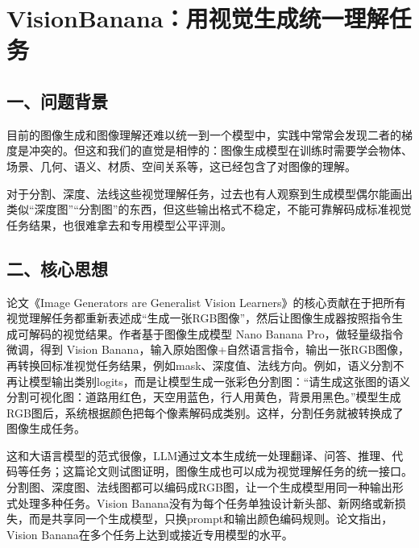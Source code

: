 \clearpage

\hypertarget{visionbananaux7528ux89c6ux89c9ux751fux6210ux7edfux4e00ux7406ux89e3ux4efbux52a1}{%
\section{VisionBanana：用视觉生成统一理解任务}\label{visionbananaux7528ux89c6ux89c9ux751fux6210ux7edfux4e00ux7406ux89e3ux4efbux52a1}}

\hypertarget{ux4e00ux95eeux9898ux80ccux666f-6}{%
\subsection{一、问题背景}\label{ux4e00ux95eeux9898ux80ccux666f-6}}

目前的图像生成和图像理解还难以统一到一个模型中，实践中常常会发现二者的梯度是冲突的。但这和我们的直觉是相悖的：图像生成模型在训练时需要学会物体、场景、几何、语义、材质、空间关系等，这已经包含了对图像的理解。

对于分割、深度、法线这些视觉理解任务，过去也有人观察到生成模型偶尔能画出类似``深度图''``分割图''的东西，但这些输出格式不稳定，不能可靠解码成标准视觉任务结果，也很难拿去和专用模型公平评测。

\hypertarget{ux4e8cux6838ux5fc3ux601dux60f3-5}{%
\subsection{二、核心思想}\label{ux4e8cux6838ux5fc3ux601dux60f3-5}}

论文《Image Generators are Generalist Vision Learners》的核心贡献在于把所有视觉理解任务都重新表述成``生成一张RGB图像''，然后让图像生成器按照指令生成可解码的视觉结果。作者基于图像生成模型 Nano Banana Pro，做轻量级指令微调，得到 Vision Banana，输入原始图像+自然语言指令，输出一张RGB图像，再转换回标准视觉任务结果，例如mask、深度值、法线方向。例如，语义分割不再让模型输出类别logits，而是让模型生成一张彩色分割图：``请生成这张图的语义分割可视化图：道路用红色，天空用蓝色，行人用黄色，背景用黑色。''模型生成RGB图后，系统根据颜色把每个像素解码成类别。这样，分割任务就被转换成了图像生成任务。

这和大语言模型的范式很像，LLM通过文本生成统一处理翻译、问答、推理、代码等任务；这篇论文则试图证明，图像生成也可以成为视觉理解任务的统一接口。分割图、深度图、法线图都可以编码成RGB图，让一个生成模型用同一种输出形式处理多种任务。Vision Banana没有为每个任务单独设计新头部、新网络或新损失，而是共享同一个生成模型，只换prompt和输出颜色编码规则。论文指出，Vision Banana在多个任务上达到或接近专用模型的水平。

